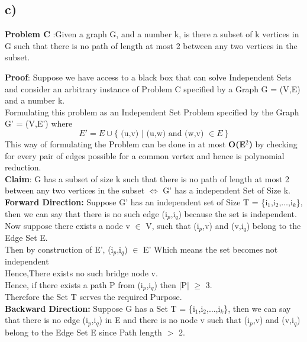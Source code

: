 \documentclass{report}
\begin{document}
 \subsection*{c)}
 \textbf{Problem C} :Given a graph G, and a number k, is there a subset of k vertices in G such that there is no path of length at most 2 between any two vertices in the subset.\vspace*{1em}\\
 \textbf{Proof}: Suppose we have access to a black box that can solve Independent Sets and consider an arbitrary instance of Problem C specified by a Graph G = (V,E) and a number k.\\
 Formulating this problem as an Independent Set Problem specified by the Graph G' = (V,E') where 
 \begin{equation*}
     E' = E \cup \{\text{ (u,v) } | \text{ (u,w) and (w,v) }\in E \ \}
 \end{equation*}
 This way of formulating the Problem can be done in at most \textbf{O(E$^2$)} by checking for every pair of edges possible for a common vertex and hence is polynomial reduction.\\
 \textbf{Claim}: G has a subset of size k such that there is no path of length at most 2 between any two vertices in the subset $\iff$ G' has a independent Set of Size k.\vspace*{0.5em}\\
\textbf{Forward Direction:} Suppose G' has an independent set of Size T = \{i$_1$,i$_2$,$\dots$,i$_k$\}, then we can say that there is no such edge (i$_p$,i$_q$) because the set is independent.\\
 Now suppose there exists a node v $\in$ V, such that (i$_p$,v) and (v,i$_q$) belong to the Edge Set E.\\
 Then by construction of E', (i$_p$,i$_q$) $\in$ E' Which means the set becomes not independent\\ Hence,There exists no such bridge node v.\\
 Hence, if there exists a path P from (i$_p$,i$_q$) then $|$P$|$ $\geq$ 3.\\
 Therefore the Set T serves the required Purpose.\vspace*{0.2em}\\
 \textbf{Backward Direction:} Suppose G has a Set T = \{i$_1$,i$_2$,$\dots$,i$_k$\}, then we can say that there is no edge (i$_p$,i$_q$) in E and there is no node v such that (i$_p$,v) and (v,i$_q$) belong to the Edge Set E since Path length $>$ 2.\\
\end{document}
